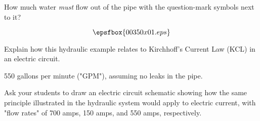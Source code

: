 

How much water {\it must} flow out of the pipe with the question-mark symbols next to it?

$$\epsfbox{00350x01.eps}$$

Explain how this hydraulic example relates to Kirchhoff's Current Law (KCL) in an electric circuit.







550 gallons per minute ("GPM"), assuming no leaks in the pipe.







Ask your students to draw an electric circuit schematic showing how the same principle illustrated in the hydraulic system would apply to electric current, with "flow rates" of 700 amps, 150 amps, and 550 amps, respectively.




